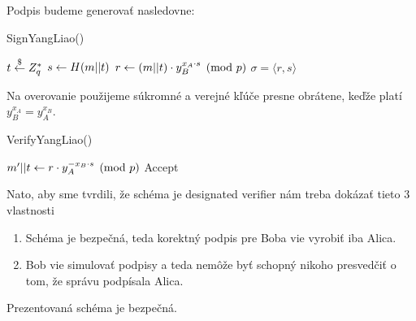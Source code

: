 Podpis budeme generovať nasledovne:
\begin{procedure}
    \caption{SignYangLiao()}
    $t \overset{\$}{\leftarrow} Z_q^*$\;
    $s \leftarrow H(m||t)$\;    
    $r \leftarrow (m||t) \cdot y_B^{x_A \cdot s} \pmod{p}$\; 
    \Return $\sigma=\langle r, s \rangle$\;
\end{procedure}

Na overovanie použijeme súkromné a verejné kľúče presne obrátene,
keďže platí $y_B^{x_A} = y_A^{x_B}$.

\begin{procedure}
    \caption{VerifyYangLiao()}
    $m'||t \leftarrow r \cdot y_A^{-x_B\cdot s} \pmod{p}$\;
    Accept\;
\end{procedure}

Nato, aby sme tvrdili, že schéma je designated verifier nám treba
dokázať tieto 3 vlastnosti
\begin{enumerate}
    \item Schéma je bezpečná, teda korektný podpis pre Boba vie
        vyrobiť iba Alica.

    \item Bob vie simulovať podpisy a teda nemôže byť schopný nikoho
        presvedčiť o tom, že správu podpísala Alica.
\end{enumerate}


\begin{lema}
    Prezentovaná schéma je bezpečná.
\end{lema}
\begin{dokaz}
    \todo{}
\end{dokaz}

